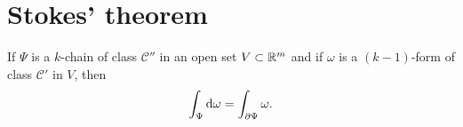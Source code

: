 
\section{Stokes' theorem}

\begin{thm}
    \label{thm:10.33}
    If $\Psi$ is a $k$-chain of class $\mathscr{C}''$ in an open set $V \subset {\protect\mathbb R}^m$ and if $\omega$ is a $(k-1)$-form of class $\mathscr{C}'$ in $V$, then 
    \begin{equation}
        \label{eq:10.91}
        \int_{\Psi} \d \omega = 
        \int_{\partial \Psi} \omega .
    \end{equation}
\end{thm}